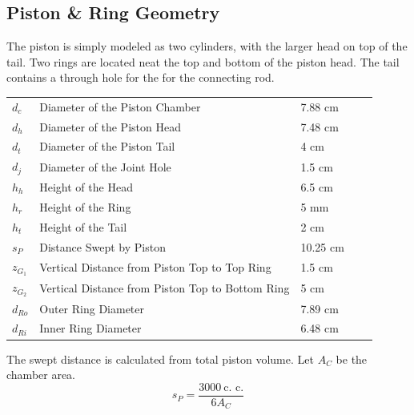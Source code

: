 \documentclass[10pt,a4paper]{article}
\begin{document}
\subsection*{Piston \& Ring Geometry}
The piston is simply modeled as two cylinders, with the larger head on top of the tail. Two rings are located neat the top and bottom of the piston head. The tail contains a through hole for the for the connecting rod.
\begin{table}[H]
\begin{tabular}{lllll}
$d_c$ & Diameter of the Piston Chamber & 7.88 cm  \\
 $d_h$& Diameter of the Piston Head & 7.48 cm   \\
 $d_t$& Diameter of the Piston Tail & 4 cm   \\
 $d_j$& Diameter of the Joint Hole & 1.5 cm   \\
 $h_h$& Height of the Head &  6.5 cm  \\
 $h_r$& Height of the Ring &  5 mm  \\
$h_t$ & Height of the Tail &  2 cm  \\
$s_P$& Distance Swept by Piston & 10.25 cm   \\
$z_{G_1}$& Vertical Distance from Piston Top to Top Ring &  1.5 cm  \\
$z_{G_2}$& Vertical Distance from Piston Top to Bottom Ring &  5 cm  \\
$d_{Ro}$& Outer Ring Diameter &  7.89 cm  \\
$d_{Ri}$ & Inner Ring Diameter & 6.48 cm 
\end{tabular}
\end{table}
The swept distance is calculated from total piston volume. Let $A_C$ be the chamber area.
$$s_P = \frac{3000\ \text{c. c.}}{6 A_C}$$
\end{document}
